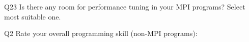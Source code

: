 \begin{description}%
\item{Q23} Is there any room for performance tuning in your MPI programs? Select most suitable one.%
\item{Q2} Rate your overall programming skill (non-MPI programs):%
\end{description}%
